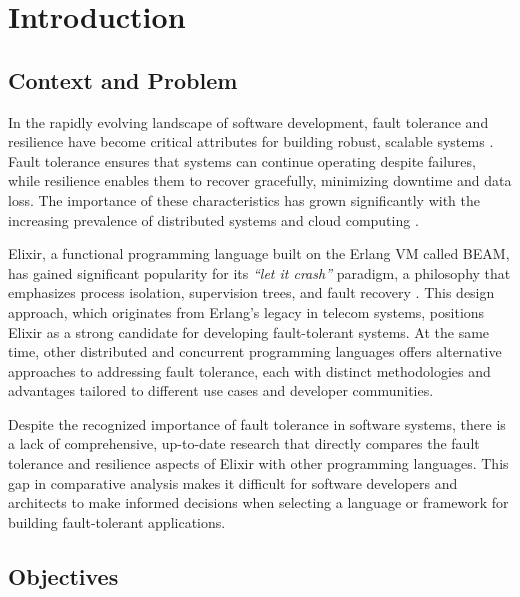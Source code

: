 % 
\chapter{Introduction} %
\label{chap:Intro} %


%
\section{Context and Problem}

In the rapidly evolving landscape of software development, fault tolerance and resilience have become critical attributes for building robust, scalable systems \cite{Kleppmann2017}. Fault tolerance ensures that systems can continue operating despite failures, while resilience enables them to recover gracefully, minimizing downtime and data loss. The importance of these characteristics has grown significantly with the increasing prevalence of distributed systems and cloud computing \cite{Tanenbaum2023,Kleppmann2017}.

Elixir, a functional programming language built on the Erlang \gls{VM} called \gls{BEAM}, has gained significant popularity for its \textit{“let it crash”} paradigm, a philosophy that emphasizes process isolation, supervision trees, and fault recovery \cite{Juric2024,go-docs,Valkov2018}. This design approach, which originates from Erlang’s legacy in telecom systems, positions Elixir as a strong candidate for developing fault-tolerant systems. At the same time, other distributed and concurrent programming languages offers alternative approaches to addressing fault tolerance, each with distinct methodologies and advantages tailored to different use cases and developer communities.

Despite the recognized importance of fault tolerance in software systems, there is a lack of comprehensive, up-to-date research that directly compares the fault tolerance and resilience aspects of Elixir with other programming languages. This gap in comparative analysis makes it difficult for software developers and architects to make informed decisions when selecting a language or framework for building fault-tolerant applications.

\section{Objectives}

